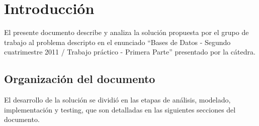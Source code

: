 \section{Introducci\'on}
El presente documento describe y analiza la soluci\'on propuesta por el grupo de trabajo al problema descripto en el 
enunciado ``Bases de Datos - Segundo cuatrimestre 2011 / Trabajo pr\'actico - Primera Parte'' presentado por la c\'atedra. \\

\subsection{Organizaci\'on del documento}
El desarrollo de la soluci\'on se dividi\'o en las etapas de an\'alisis, modelado, implementaci\'on y testing, que son detalladas
en las siguientes secciones del documento.

